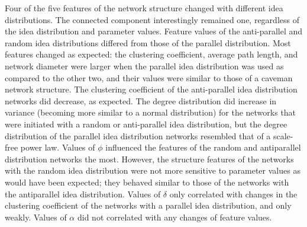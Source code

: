 Four of the five features of the network structure changed with different idea distributions. The connected component interestingly remained one, regardless of the idea distribution and parameter values. Feature values of the anti-parallel and random idea distributions differed from those of the parallel distribution. Most features changed as expected: the clustering coefficient, average path length, and network diameter were larger when the parallel idea distribution was used as compared to the other two, and their values were similar to those of a caveman network structure. The clustering coefficient of the anti-parallel idea distribution networks did decrease, as expected. The degree distribution did increase in variance (becoming more similar to a normal distribution) for the networks that were initiated with a random or anti-parallel idea distribution, but the degree distribution of the parallel idea distribution networks resembled that of a scale-free power law. Values of $\phi$ influenced the features of the random and antiparallel distribution networks the most. However, the structure features of the networks with the random idea distribution were not more sensitive to parameter values as would have been expected; they behaved similar to those of the networks with the antiparallel idea distribution. Values of $\delta$ only correlated with changes in the clustering coefficient of the networks with a parallel idea distribution, and only weakly. Values of $\alpha$ did not correlated with any changes of feature values. 
